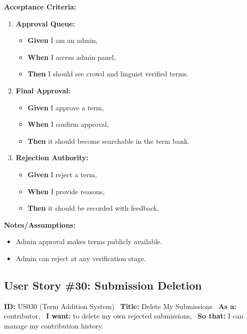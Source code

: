 \documentclass[12pt]{article}
\begin{document}
\vspace{1em}
\textbf{Acceptance Criteria:}
\begin{enumerate}
\item \textbf{Approval Queue:}
\begin{itemize}
\item \textbf{Given} I am an admin,
\item \textbf{When} I access admin panel,
\item \textbf{Then} I should see crowd and linguist verified terms.
\end{itemize}

\item \textbf{Final Approval:}
\begin{itemize}
    \item \textbf{Given} I approve a term,
    \item \textbf{When} I confirm approval,
    \item \textbf{Then} it should become searchable in the term bank.
\end{itemize}

\item \textbf{Rejection Authority:}
\begin{itemize}
    \item \textbf{Given} I reject a term,
    \item \textbf{When} I provide reasons,
    \item \textbf{Then} it should be recorded with feedback.
\end{itemize}
\end{enumerate}

\vspace{1em}
\textbf{Notes/Assumptions:}
\begin{itemize}
\item Admin approval makes terms publicly available.
\item Admin can reject at any verification stage.
\end{itemize}

\subsection{User Story \#30: Submission Deletion}
\textbf{ID:} US030 (Term Addition System) \
\textbf{Title:} Delete My Submissions \
\textbf{As a:} contributor, \
\textbf{I want:} to delete my own rejected submissions, \
\textbf{So that:} I can manage my contribution history.
\end{document}
